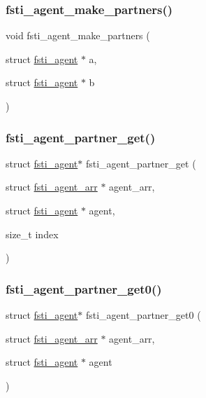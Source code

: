 \subsubsection{\texorpdfstring{fsti\+\_\+agent\+\_\+make\+\_\+partners()}{fsti\_agent\_make\_partners()}}
{\footnotesize\ttfamily void fsti\+\_\+agent\+\_\+make\+\_\+partners (\begin{DoxyParamCaption}\item[{struct \mbox{\hyperlink{structfsti__agent}{fsti\+\_\+agent}} $\ast$}]{a,  }\item[{struct \mbox{\hyperlink{structfsti__agent}{fsti\+\_\+agent}} $\ast$}]{b }\end{DoxyParamCaption})}

\mbox{\label{fsti-agent_8h_a8ea9850f51ba1cc3f842f3730cf22139}} 
\subsubsection{\texorpdfstring{fsti\+\_\+agent\+\_\+partner\+\_\+get()}{fsti\_agent\_partner\_get()}}
{\footnotesize\ttfamily struct \mbox{\hyperlink{structfsti__agent}{fsti\+\_\+agent}}$\ast$ fsti\+\_\+agent\+\_\+partner\+\_\+get (\begin{DoxyParamCaption}\item[{struct \mbox{\hyperlink{structfsti__agent__arr}{fsti\+\_\+agent\+\_\+arr}} $\ast$}]{agent\+\_\+arr,  }\item[{struct \mbox{\hyperlink{structfsti__agent}{fsti\+\_\+agent}} $\ast$}]{agent,  }\item[{size\+\_\+t}]{index }\end{DoxyParamCaption})}

\mbox{\label{fsti-agent_8h_abe4c0c13ceb1a50eb8d9223a7122f269}} 
\subsubsection{\texorpdfstring{fsti\+\_\+agent\+\_\+partner\+\_\+get0()}{fsti\_agent\_partner\_get0()}}
{\footnotesize\ttfamily struct \mbox{\hyperlink{structfsti__agent}{fsti\+\_\+agent}}$\ast$ fsti\+\_\+agent\+\_\+partner\+\_\+get0 (\begin{DoxyParamCaption}\item[{struct \mbox{\hyperlink{structfsti__agent__arr}{fsti\+\_\+agent\+\_\+arr}} $\ast$}]{agent\+\_\+arr,  }\item[{struct \mbox{\hyperlink{structfsti__agent}{fsti\+\_\+agent}} $\ast$}]{agent }\end{DoxyParamCaption})}

